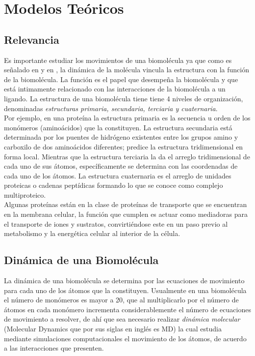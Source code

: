 \chapter{Modelos Te\'{o}ricos}
\section{Relevancia}
Es importante estudiar los movimientos de una biomol\'{e}cula ya que como es se\~{n}alado en \cite{Lezon2009} y en  \cite{Rader2006}, la din\'{a}mica de la mol\'{e}cula vincula la estructura con la funci\'{o}n de la biomol\'{e}cula. La funci\'{o}n es el papel que desempe\~{n}a la biomol\'{e}cula y que est\'{a} intimamente relacionado con las interacciones de la biomol\'{e}cula a un ligando. La estructura de una biomol\'{e}cula tiene tiene 4 niveles de organizaci\'{o}n, denominadas \textit{estructuras primaria, secundaria, terciaria y cuaternaria}.\\

Por ejemplo, en una prote\'{i}na la estructura primaria es la secuencia u  orden de los mon\'{o}meros (amino\'{a}cidos) que la constituyen. La estructura secundaria est\'{a} determinada por los puentes de hidr\'{o}geno existentes entre los grupos amino y carboxilo de dos amino\'{a}cidos diferentes; predice la estructura tridimensional en forma local. Mientras que la estructura terciaria la da el arreglo tridimensional de cada uno de sus \'{a}tomos, espec\'{i}ficamente se determina con las coordenadas de cada uno de los \'{a}tomos. La estructura cuaternaria es el arreglo de unidades proteicas o cadenas pept\'{i}dicas formando lo que se conoce como complejo multiproteico.\\

Algunas prote\'{i}nas est\'{a}n en la clase de prote\'{i}nas de transporte que se encuentran en la membrana celular, la funci\'{o}n que cumplen es actuar como mediadoras para el transporte de iones y sustratos, convirti\'{e}ndose este en un paso previo al metabolismo y la energ\'{e}tica celular al interior de la c\'{e}lula.\\
\section{Din\'{a}mica de una Biomol\'{e}cula}

La din\'{a}mica de una biomol\'{e}cula se determina por las ecuaciones de movimiento para cada uno de los \'{a}tomos que la constituyen. Usualmente en una biomol\'{e}cula el n\'{u}mero de mon\'{o}meros es mayor a 20, que al multiplicarlo por el n\'{u}mero de \'{a}tomos en cada mon\'{o}mero incrementa considerablemente el n\'{u}mero de ecuaciones de movimiento a resolver, de ah\'{i} que sea necesario realizar \textit{din\'{a}mica molecular} (Molecular Dynamics que por sus siglas en ingl\'{e}s es MD) la cual estudia mediante simulaciones computacionales el movimiento de los \'{a}tomos, de acuerdo a las interacciones que presenten.\\

